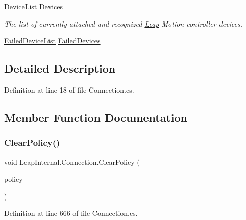 \begin{DoxyCompactItemize}
\mbox{\hyperlink{class_leap_1_1_device_list}{Device\+List}} \mbox{\hyperlink{class_leap_internal_1_1_connection_a986b77cb70270ee5d44d1d83db845dfe}{Devices}}
\begin{DoxyCompactList}\small\item\em The list of currently attached and recognized \mbox{\hyperlink{namespace_leap}{Leap}} Motion controller devices. \end{DoxyCompactList}\item 
\mbox{\hyperlink{class_leap_1_1_failed_device_list}{Failed\+Device\+List}} \mbox{\hyperlink{class_leap_internal_1_1_connection_ae45e28603b9dd28c0c30b8f57f2a3366}{Failed\+Devices}}
\end{DoxyCompactItemize}


\subsection{Detailed Description}


Definition at line 18 of file Connection.\+cs.



\subsection{Member Function Documentation}
\mbox{\label{class_leap_internal_1_1_connection_add28c0b2f62ef7b394e194989ad3b424}} 
\subsubsection{\texorpdfstring{ClearPolicy()}{ClearPolicy()}}
{\footnotesize\ttfamily void Leap\+Internal.\+Connection.\+Clear\+Policy (\begin{DoxyParamCaption}\item[{\mbox{\hyperlink{class_leap_1_1_controller_a0bdb49fa94aa2da8b098c1ac296528d6}{Controller.\+Policy\+Flag}}}]{policy }\end{DoxyParamCaption})}



Definition at line 666 of file Connection.\+cs.

